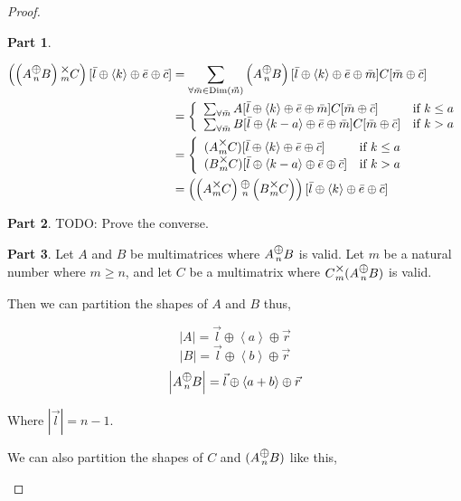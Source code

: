 \documentclass[12pt]{book}
\theoremstyle{plain}
\theoremstyle{definition}
\theoremstyle{ppart}
\newtheorem{ppart}{Part}
\theoremstyle{case}
\theoremstyle{solution}
\DeclareMathOperator{\Dim}{Dim}
\newcommand{\mmult}[1]{\text{\raisebox{1ex}{$\underset{#1}{\times}$}}}
\newcommand{\mconcat}[1]{\text{\raisebox{1ex}{$\underset{#1}{\oplus}$}}}
\newcommand{\shape}[1]{\left|#1\right|}
\begin{document}
\begin{proof}
\begin{ppart}
\begin{landscape}
\begin{align*}
  \left(\left(A \mconcat{n} B\right) \mmult{m} C\right)[\bar{l} \oplus \left<k\right> \oplus \bar{e} \oplus \bar{c}]
  &= \sum_{\forall \bar{m} \in \Dim(\vec{m})} \left(A \mconcat{n} B\right)[\bar{l} \oplus \left<k\right> \oplus \bar{e} \oplus \bar{m}] C[\bar{m} \oplus \bar{c}] \\
  &= \left\{
  \begin{array}{ll}
    \sum_{\forall \bar{m}} A[\bar{l} \oplus \left<k\right> \oplus \bar{e} \oplus \bar{m}] C[\bar{m} \oplus \bar{c}] 
    & \mbox{if } k \le a \\
    \sum_{\forall \bar{m}} B[\bar{l} \oplus \left<k-a\right> \oplus \bar{e} \oplus \bar{m}] C[\bar{m} \oplus \bar{c}] 
    & \mbox{if } k > a
  \end{array}
  \right. \\
  &= \left\{
  \begin{array}{ll}
    (A \mmult{m} C)[\bar{l} \oplus \left<k\right> \oplus \bar{e} \oplus \bar{c}]
    & \mbox{if } k \le a \\
    (B \mmult{m} C)[\bar{l} \oplus \left<k-a\right> \oplus \bar{e} \oplus \bar{c}]
    & \mbox{if } k > a
  \end{array}
  \right. \\
  &= 
    \left(\left(A \mmult{m} C\right) \mconcat{n} \left(B \mmult{m} C\right)\right)
    [\bar{l} \oplus \left<k\right> \oplus \bar{e} \oplus \bar{c}]
\end{align*}
\end{landscape}
\end{ppart}

\begin{ppart}
TODO: Prove the converse.
\end{ppart}

\begin{ppart}
Let $A$ and $B$ be multimatrices where $A \mconcat{n} B$ is valid. 
Let $m$ be a natural number where $m \ge n$, and let $C$ be a multimatrix where
$C \mmult{m} (A \mconcat{n} B)$ is valid.

Then we can partition the shapes of $A$ and $B$ thus,

\[ \shape{A} = \vec{l} \oplus \left<a\right> \oplus \vec{r} \]
\[ \shape{B} = \vec{l} \oplus \left<b\right> \oplus \vec{r} \]
\[ \shape{A \mconcat{n} B} = \vec{l} \oplus \left<a+b\right> \oplus \vec{r} \]

Where $\shape{\vec{l}} = n-1$. 

We can also partition the shapes of $C$ and $(A \mconcat{n} B)$ like this,


\end{ppart}
\end{proof}
\end{document}
